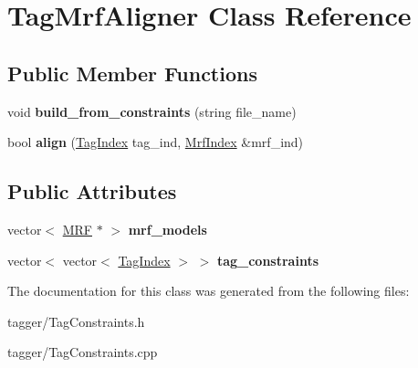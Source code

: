 \hypertarget{class_tag_mrf_aligner}{
\section{TagMrfAligner Class Reference}
\label{class_tag_mrf_aligner}
}
\subsection*{Public Member Functions}
\begin{DoxyCompactItemize}
\item 
\hypertarget{class_tag_mrf_aligner_ae2bae21b52efb547b46f2da80f61ec42}{
void {\bfseries build\_\-from\_\-constraints} (string file\_\-name)}
\label{class_tag_mrf_aligner_ae2bae21b52efb547b46f2da80f61ec42}

\item 
\hypertarget{class_tag_mrf_aligner_a5b6ecf59596d656333f8113f6f05eba4}{
bool {\bfseries align} (\hyperlink{struct_tag_index}{TagIndex} tag\_\-ind, \hyperlink{struct_mrf_index}{MrfIndex} \&mrf\_\-ind)}
\label{class_tag_mrf_aligner_a5b6ecf59596d656333f8113f6f05eba4}

\end{DoxyCompactItemize}
\subsection*{Public Attributes}
\begin{DoxyCompactItemize}
\item 
\hypertarget{class_tag_mrf_aligner_a8a5d34bcfecdfb8c3901297ad34e301d}{
vector$<$ \hyperlink{class_m_r_f}{MRF} $\ast$ $>$ {\bfseries mrf\_\-models}}
\label{class_tag_mrf_aligner_a8a5d34bcfecdfb8c3901297ad34e301d}

\item 
\hypertarget{class_tag_mrf_aligner_ae20f5a7d1131701986a36b70dca2c26f}{
vector$<$ vector$<$ \hyperlink{struct_tag_index}{TagIndex} $>$ $>$ {\bfseries tag\_\-constraints}}
\label{class_tag_mrf_aligner_ae20f5a7d1131701986a36b70dca2c26f}

\end{DoxyCompactItemize}


The documentation for this class was generated from the following files:\begin{DoxyCompactItemize}
\item 
tagger/TagConstraints.h\item 
tagger/TagConstraints.cpp\end{DoxyCompactItemize}
